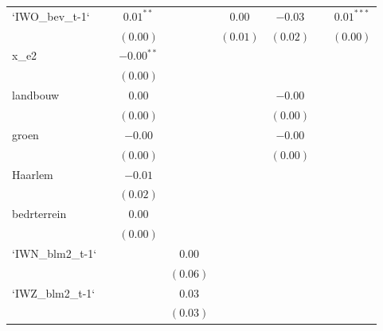 \begin{center}
\begin{longtable}{l c c c c c c c }
`IWO\_bev\_t-1`  &               & $0.01^{**}$  &               & $0.00$        & $-0.03$       &               & $0.01^{***}$  \\
                 &               & $(0.00)$     &               & $(0.01)$      & $(0.02)$      &               & $(0.00)$      \\
x\_e2            &               & $-0.00^{**}$ &               &               &               &               &               \\
                 &               & $(0.00)$     &               &               &               &               &               \\
landbouw         &               & $0.00$       &               &               & $-0.00$       &               &               \\
                 &               & $(0.00)$     &               &               & $(0.00)$      &               &               \\
groen            &               & $-0.00$      &               &               & $-0.00$       &               &               \\
                 &               & $(0.00)$     &               &               & $(0.00)$      &               &               \\
Haarlem          &               & $-0.01$      &               &               &               &               &               \\
                 &               & $(0.02)$     &               &               &               &               &               \\
bedrterrein      &               & $0.00$       &               &               &               &               &               \\
                 &               & $(0.00)$     &               &               &               &               &               \\
`IWN\_blm2\_t-1` &               &              & $0.00$        &               &               &               &               \\
                 &               &              & $(0.06)$      &               &               &               &               \\
`IWZ\_blm2\_t-1` &               &              & $0.03$        &               &               &               &               \\
                 &               &              & $(0.03)$      &               &               &               &               \\

\end{longtable}
\end{center}
